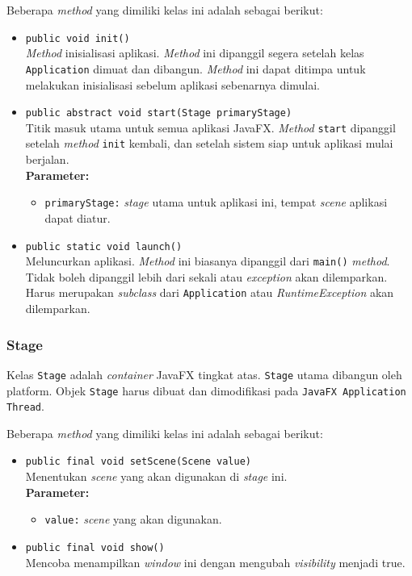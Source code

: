 Beberapa \textit{method} yang dimiliki kelas ini adalah sebagai berikut:
\begin{itemize}
	\item \texttt{public void init()}\\
	\textit{Method} inisialisasi aplikasi. \textit{Method} ini dipanggil segera setelah kelas \texttt{Application} dimuat dan dibangun. \textit{Method} ini dapat ditimpa untuk melakukan inisialisasi sebelum aplikasi sebenarnya dimulai.
	
	\item \texttt{public abstract void start(Stage primaryStage)}\\
	Titik masuk utama untuk semua aplikasi JavaFX. \textit{Method} \texttt{start} dipanggil setelah \textit{method} \texttt{init} kembali, dan setelah sistem siap untuk aplikasi mulai berjalan.\\
	\textbf{Parameter:}
	\begin{itemize}
		\item \texttt{primaryStage:} \textit{stage} utama untuk aplikasi ini, tempat \textit{scene} aplikasi dapat diatur.
	\end{itemize}
	
	\item \texttt{public static void launch()}\\
    Meluncurkan aplikasi. \textit{Method} ini biasanya dipanggil dari \texttt{main()} \textit{method}. Tidak boleh dipanggil lebih dari sekali atau \textit{exception} akan dilemparkan. Harus merupakan \textit{subclass} dari \texttt{Application} atau \textit{RuntimeException} akan dilemparkan.\\
\end{itemize}


\subsubsection{Stage}
Kelas \texttt{Stage} adalah \textit{container} JavaFX tingkat atas. \texttt{Stage} utama dibangun oleh platform. Objek \texttt{Stage} harus dibuat dan dimodifikasi pada \texttt{JavaFX Application Thread}.

Beberapa \textit{method} yang dimiliki kelas ini adalah sebagai berikut:
\begin{itemize}
	\item \texttt{public final void setScene(Scene value)}\\
	Menentukan \textit{scene} yang akan digunakan di \textit{stage} ini.\\
	\textbf{Parameter:}
	\begin{itemize}
		\item \texttt{value:} \textit{scene} yang akan digunakan.
	\end{itemize}
	
	\item \texttt{public final void show()}\\
	Mencoba menampilkan \textit{window} ini dengan mengubah \textit{visibility} menjadi true.
\end{itemize}


